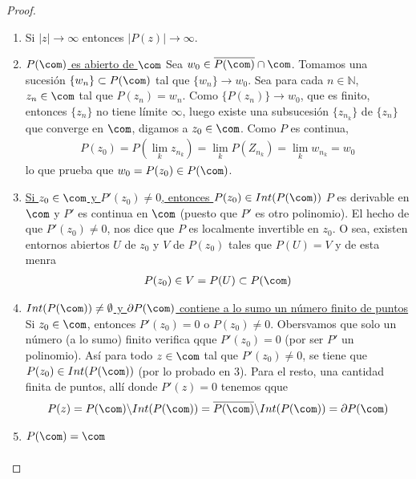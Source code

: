 \begin{proof}
\begin{enumerate}
    \item Si $|z| \to \infty$ entonces $|P(z)| \to \infty$.
    \item \underline{$P(\com)$ es abierto de $\com$}
    \newline
    Sea $w_0 \in \overline{P(\com)} \cap \com$. Tomamos una sucesión $\{w_n\} \subset P(\com)$ tal que $\{w_n\} \to w_0$. Sea para cada $n \in \mathbb{N}$, $z_n \in \com$ tal que $P(z_n) = w_n$. Como $\{P(z_n)\} \to w_0$, que es finito, entonces $\{z_n\}$ no tiene límite $\infty$, luego existe una subsucesión $\{z_{n_k}\}$ de $\{z_n\}$ que converge en $\com$, digamos a $z_0 \in \com$. Como $P$ es continua,
    \begin{align*}
        P(z_0) = P\left( \lim_{k}{z_{n_k}}\right) = \lim_{k}{P(Z_{n_k})} = \lim_{k}{w_{n_k}} = w_0
    \end{align*}
    lo que prueba que $w_0 = P(z_0) \in P(\com)$.
    \item \underline{Si $z_0 \in \com$ y $P'(z_0) \not = 0$, entonces $P(z_0) \in Int(P(\com))$}
    \newline
    $P$ es derivable en $\com$ y $P'$ es continua en $\com$ (puesto que $P'$ es otro polinomio). El hecho de que $P'(z_0) \not = 0$, nos dice que $P$ es localmente invertible en $z_0$. O sea, existen entornos abiertos $U$ de $z_0$ y $V$ de $P(z_0)$ tales que $P(U) = V$ y de esta menra
    \begin{align*}
        P(z_0) \in V = P(U) \subset P(\com)
    \end{align*}
    \item \underline{$Int(P(\com)) \not = \emptyset$ y $\partial P(\com)$ contiene a lo sumo un número finito de puntos}
    \newline
    Si $z_0 \in \com$, entonces $P'(z_0) = 0$ o $P(z_0) \not = 0$. Obersvamos que solo un número (a lo sumo) finito verifica qque $P'(z_0) = 0$ (por ser $P'$ un polinomio). Así para todo $z \in \com$ tal que $P'(z_0) \not = 0$, se tiene que $P(z_0) \in Int(P(\com))$ (por lo probado en 3). Para el resto, una cantidad finita de puntos, allí donde $P'(z) = 0$ tenemos qque
    \begin{align*}
        P(z) = P(\com) \backslash Int(P(\com)) = \overline{P(\com)} \backslash Int(P(\com)) = \partial P(\com)
    \end{align*}
    \item \underline{$P(\com) = \com$}
    \begin{align*}

\end{align*}
\end{enumerate}
\end{proof}
